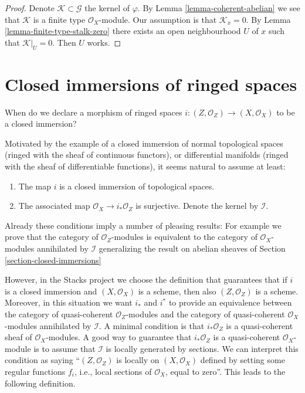 \begin{proof}
Denote $\mathcal{K} \subset \mathcal{G}$ the kernel of $\varphi$.
By Lemma \ref{lemma-coherent-abelian} we see that $\mathcal{K}$ is
a finite type $\mathcal{O}_X$-module. Our assumption is that
$\mathcal{K}_x = 0$. By Lemma \ref{lemma-finite-type-stalk-zero}
there exists an open neighbourhood $U$ of $x$ such that $\mathcal{K}|_U = 0$.
Then $U$ works.
\end{proof}













\section{Closed immersions of ringed spaces}
\label{section-closed-immersion}

\noindent
When do we declare a morphism of ringed spaces
$i : (Z, \mathcal{O}_Z) \to (X, \mathcal{O}_X)$
to be a closed immersion?

\medskip\noindent
Motivated by the example of a closed immersion of normal topological spaces
(ringed with the sheaf of continuous functors), or differential manifolds
(ringed with the sheaf of differentiable functions), it seems natural to
assume at least:
\begin{enumerate}
\item The map $i$ is a closed immersion of topological spaces.
\item The associated map $\mathcal{O}_X \to i_*\mathcal{O}_Z$
is surjective. Denote the kernel by $\mathcal{I}$.
\end{enumerate}
Already these conditions imply a number of pleasing results: For example
we prove that the category of $\mathcal{O}_Z$-modules is equivalent to
the category of $\mathcal{O}_X$-modules annihilated by $\mathcal{I}$
generalizing the result on abelian sheaves of
Section \ref{section-closed-immersions}

\medskip\noindent
However, in the Stacks project we choose the
definition that guarantees that if $i$ is a closed immersion
and $(X, \mathcal{O}_X)$ is a scheme, then also $(Z, \mathcal{O}_Z)$
is a scheme. Moreover, in this situation we want $i_*$ and $i^*$
to provide an equivalence between the category of quasi-coherent
$\mathcal{O}_Z$-modules and the category of quasi-coherent
$\mathcal{O}_X$-modules annihilated by $\mathcal{I}$.
A minimal condition is that $i_*\mathcal{O}_Z$ is a
quasi-coherent sheaf of $\mathcal{O}_X$-modules.
A good way to guarantee that $i_*\mathcal{O}_Z$ is a
quasi-coherent $\mathcal{O}_X$-module is to assume that
$\mathcal{I}$ is locally generated by sections.
We can interpret this condition as saying ``$(Z, \mathcal{O}_Z)$ is
locally on $(X, \mathcal{O}_X)$ defined by setting some regular functions
$f_i$, i.e., local sections of $\mathcal{O}_X$, equal to zero''.
This leads to the following definition.

